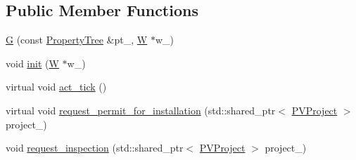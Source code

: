 \subsection*{Public Member Functions}
{\bf }\par
\begin{DoxyCompactItemize}
\item 
\hyperlink{classsolar__core_1_1_g_a624adac31ade604e0335717bad4fc9cd}{G} (const \hyperlink{namespacesolar__core_adeda2737d6938c190eb774a5b2495045}{Property\+Tree} \&pt\+\_\+, \hyperlink{classsolar__core_1_1_w}{W} $\ast$w\+\_\+)
\item 
void \hyperlink{classsolar__core_1_1_g_a0734da633e88ea0f6ff782d4b6521c09}{init} (\hyperlink{classsolar__core_1_1_w}{W} $\ast$w\+\_\+)
\item 
virtual void \hyperlink{classsolar__core_1_1_g_ad3c9fb1da4db51b296c29a6b94b0f139}{act\+\_\+tick} ()
\end{DoxyCompactItemize}

{\bf }\par
\begin{DoxyCompactItemize}
\item 
virtual void \hyperlink{classsolar__core_1_1_g_a615600f35d73a38ea48e99909fff5085}{request\+\_\+permit\+\_\+for\+\_\+installation} (std\+::shared\+\_\+ptr$<$ \hyperlink{classsolar__core_1_1_p_v_project}{P\+V\+Project} $>$ project\+\_\+)
\item 
void \hyperlink{classsolar__core_1_1_g_ae5836aff26a74e47cd26081fb94641bb}{request\+\_\+inspection} (std\+::shared\+\_\+ptr$<$ \hyperlink{classsolar__core_1_1_p_v_project}{P\+V\+Project} $>$ project\+\_\+)
\end{DoxyCompactItemize}

